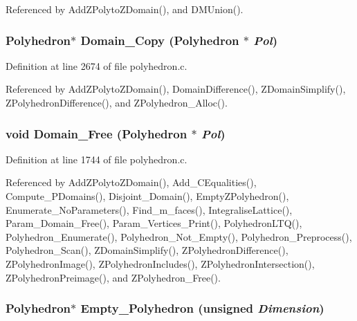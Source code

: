 Referenced by Add\-ZPolyto\-ZDomain(), and DMUnion().

\subsubsection{\setlength{\rightskip}{0pt plus 5cm}Polyhedron$\ast$ Domain\_\-Copy (Polyhedron $\ast$ {\em Pol})}\label{polyhedron_8c_a37}




Definition at line 2674 of file polyhedron.c.

Referenced by Add\-ZPolyto\-ZDomain(), Domain\-Difference(), ZDomain\-Simplify(), ZPolyhedron\-Difference(), and ZPolyhedron\_\-Alloc().

\subsubsection{\setlength{\rightskip}{0pt plus 5cm}void Domain\_\-Free (Polyhedron $\ast$ {\em Pol})}\label{polyhedron_8c_a19}




Definition at line 1744 of file polyhedron.c.

Referenced by Add\-ZPolyto\-ZDomain(), Add\_\-CEqualities(), Compute\_\-PDomains(), Disjoint\_\-Domain(), Empty\-ZPolyhedron(), Enumerate\_\-No\-Parameters(), Find\_\-m\_\-faces(), Integralise\-Lattice(), Param\_\-Domain\_\-Free(), Param\_\-Vertices\_\-Print(), Polyhedron\-LTQ(), Polyhedron\_\-Enumerate(), Polyhedron\_\-Not\_\-Empty(), Polyhedron\_\-Preprocess(), Polyhedron\_\-Scan(), ZDomain\-Simplify(), ZPolyhedron\-Difference(), ZPolyhedron\-Image(), ZPolyhedron\-Includes(), ZPolyhedron\-Intersection(), ZPolyhedron\-Preimage(), and ZPolyhedron\_\-Free().

\subsubsection{\setlength{\rightskip}{0pt plus 5cm}Polyhedron$\ast$ Empty\_\-Polyhedron (unsigned {\em Dimension})}\label{polyhedron_8c_a22}




